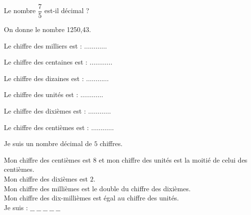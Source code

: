 \begin{pageAD}
\begin{minipage}{0.38\linewidth}



Le nombre $\dfrac{7}{5}$ est-il décimal ?
 

\end{minipage}

\vspace{0.5cm}



\begin{minipage}{0.48\linewidth}


On donne le  nombre 1250,43. 
\begin{description}
\item Le chiffre des milliers est : $ \ldots\ldots\ldots\ldots $
\item Le chiffre des centaines est : $ \ldots\ldots\ldots\ldots $
\item Le chiffre des dizaines est : $ \ldots\ldots\ldots\ldots $
\item Le chiffre des unités est : $ \ldots\ldots\ldots\ldots $
\item Le chiffre des dixièmes est : $ \ldots\ldots\ldots\ldots $
\item Le chiffre des centièmes est : $ \ldots\ldots\ldots\ldots $
\end{description}

\end{minipage}\hfill
\begin{minipage}{0.48\linewidth}

 
Je suis un nombre décimal de $5$ chiffres.

Mon chiffre des centièmes est $8$ et mon chiffre des unités est la moitié de celui des centièmes.\\
Mon chiffre des dixièmes est $2$. \\
Mon chiffre des millièmes est le double du chiffre des dixièmes.\\
Mon chiffre des dix-millièmes est égal au chiffre des unités. \\ 
Je suis : $  \_\_\; \_\_\; \_\_\; \_\_\; \_\_\; $

\end{minipage}

\end{pageAD}  


